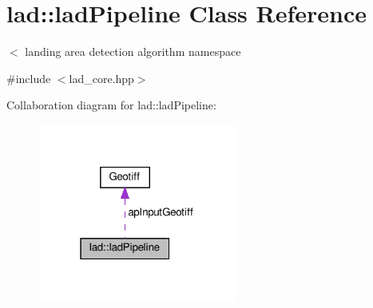 \hypertarget{classlad_1_1lad_pipeline}{}\section{lad\+:\+:lad\+Pipeline Class Reference}
\label{classlad_1_1lad_pipeline}


$<$ landing area detection algorithm namespace  




{\ttfamily \#include $<$lad\+\_\+core.\+hpp$>$}



Collaboration diagram for lad\+:\+:lad\+Pipeline\+:\nopagebreak
\begin{figure}[H]
\begin{center}
\leavevmode
\includegraphics[width=187pt]{classlad_1_1lad_pipeline__coll__graph}
\end{center}
\end{figure}
